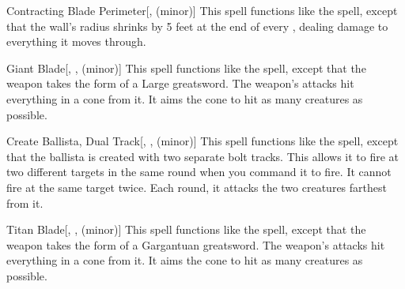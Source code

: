 \lowercase{\hypertarget{spell:Contracting Blade Perimeter}{}}\label{spell:Contracting Blade Perimeter}
\begin{freeability}[\nth{3}]{\hypertarget{spell:Contracting Blade Perimeter}{Contracting Blade Perimeter}}[,  (minor)]
This spell functions like the  spell, except that the wall's radius shrinks by 5 feet at the end of every , dealing damage to everything it moves through.
\end{freeability}
\vspace{0.25em}



\lowercase{\hypertarget{spell:Giant Blade}{}}\label{spell:Giant Blade}
\begin{freeability}[\nth{3}]{\hypertarget{spell:Giant Blade}{Giant Blade}}[, ,  (minor)]
This spell functions like the  spell, except that the weapon takes the form of a Large greatsword.
The weapon's attacks hit everything in a \areasmall cone from it.
It aims the cone to hit as many creatures as possible.
\end{freeability}
\vspace{0.25em}



\lowercase{\hypertarget{spell:Create Ballista, Dual Track}{}}\label{spell:Create Ballista, Dual Track}
\begin{freeability}[\nth{4}]{\hypertarget{spell:Create Ballista, Dual Track}{Create Ballista, Dual Track}}[, ,  (minor)]
This spell functions like the  spell, except that the ballista is created with two separate bolt tracks.
This allows it to fire at two different targets in the same round when you command it to fire.
It cannot fire at the same target twice.
Each round, it attacks the two creatures farthest from it.
\end{freeability}
\vspace{0.25em}



\lowercase{\hypertarget{spell:Titan Blade}{}}\label{spell:Titan Blade}
\begin{freeability}[\nth{6}]{\hypertarget{spell:Titan Blade}{Titan Blade}}[, ,  (minor)]
This spell functions like the  spell, except that the weapon takes the form of a Gargantuan greatsword.
The weapon's attacks hit everything in a \areamed cone from it.
It aims the cone to hit as many creatures as possible.
\end{freeability}
\vspace{0.25em}



